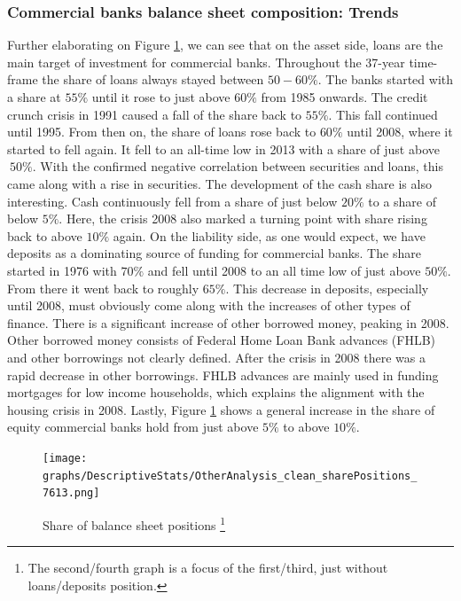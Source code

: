 \documentclass[12pt, a4paper]{article} %
\begin{document}
\subsubsection{Commercial banks balance sheet composition: Trends}
\label{sec:shareBalanceSheetAccounts}
Further elaborating on Figure \ref{fig:share_both}, we can see that on the asset side, loans are the main target of investment for commercial banks. Throughout the 37-year time-frame the share of loans always stayed between $50-60\%$. The banks started with a share at $55\%$ until it rose to just above $60\%$ from 1985 onwards. The credit crunch crisis in 1991 caused a fall of the share back to $55\%$. This fall continued until 1995. From then on, the share of loans rose back to $60\%$ until 2008, where it started to fell again. It fell to an all-time low in 2013 with a share of just above $~50\%$. With the confirmed negative correlation between securities and loans, this came along with a rise in securities. 
The development of the cash share is also interesting. Cash continuously fell from a share of just below $20\%$ to a share of below $5\%$. Here, the crisis 2008 also marked a turning point with share rising back to above $10\%$ again. 
On the liability side, as one would expect, we have deposits as a dominating source of funding for commercial banks. The share started in 1976 with $70\%$ and fell until 2008 to an all time low of just above $50\%$. From there it went back to roughly $65\%$. This decrease in deposits, especially until 2008, must obviously come along with the increases of other types of finance. There is a significant increase of other borrowed money, peaking in 2008. Other borrowed money consists of Federal Home Loan Bank advances (FHLB) and other borrowings not clearly defined. After the crisis in 2008 there was a rapid decrease in other borrowings. FHLB advances are mainly used in funding mortgages for low income households, which explains the alignment with the housing crisis in 2008.  Lastly, Figure \ref{fig:share_both} shows a general increase in the share of equity commercial banks hold from just above $5\%$ to above $10\%$. 

\begin{figure}[H]
\begin{minipage}{\textwidth}
\centering
\caption[1]{Share of balance sheet positions \footnote{The second/fourth graph is a focus of the first/third, just without loans/deposits position.} }
\texttt{[image: graphs/DescriptiveStats/OtherAnalysis\_clean\_sharePositions\_7613.png]}
\label{fig:share_both}
\end{minipage}
\end{figure}
 
\end{document}
